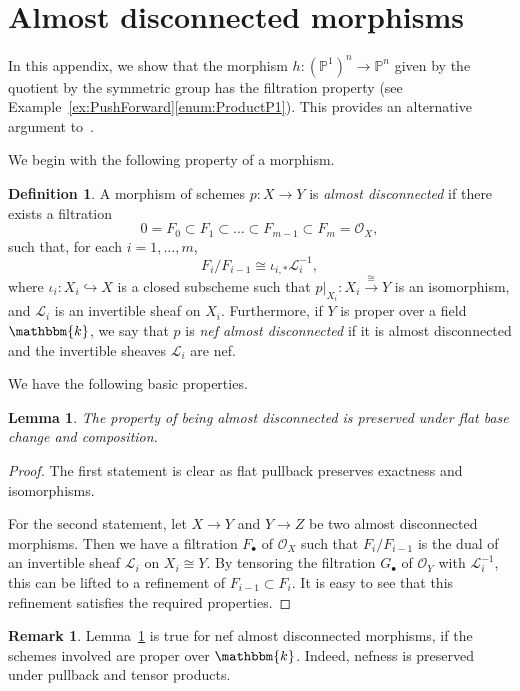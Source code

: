 \documentclass[11pt, reqno]{amsart}
\numberwithin{equation}{section}
\theoremstyle{plain}
\newtheorem{lemma}[theorem]{Lemma}
\theoremstyle{remark}
\theoremstyle{definition}
\newtheorem{definition}[theorem]{Definition}
\newtheorem{remark}[theorem]{Remark}
\theoremstyle{italicsname}
\newcommand{\cO}{\mathcal{O}}
\newcommand{\cL}{\mathcal{L}}
\newcommand{\KK}{\mathbbm{k}}
\def\PP{\ensuremath{\mathbb{P}}}
\begin{document}

\section{Almost disconnected morphisms}\label{app:Filtration}

In this appendix, we show that the morphism $h\colon(\PP^1)^n\to\PP^n$ given by the quotient by the symmetric group has the filtration property (see Example~\ref{ex:PushForward}\eqref{enum:ProductP1}). 
This provides an alternative argument to~\cite[Section 4]{chunyi-stability}.

We begin with the following property of a morphism.

\begin{definition}\label{def:AlmostDisconnected}
A morphism of schemes $p\colon X\to Y$ is \emph{almost disconnected} if there exists a filtration
\[
0=F_0 \subset F_1 \subset\dots\subset F_{m-1}\subset F_m=\cO_X,
\]
such that, for each $i=1,\dots,m$,
\[
F_i/F_{i-1}\cong \iota_{i,*}\cL_i^{-1},
\]
where $\iota_i\colon X_i\hookrightarrow X$ is a closed subscheme such that $p|_{X_i}\colon X_i\xrightarrow{\cong}Y$ is an isomorphism, and $\cL_i$ is an invertible sheaf on $X_i$.
Furthermore, if $Y$ is proper over a field $\KK$, we say that $p$ is \emph{nef almost disconnected} if it is almost disconnected and the invertible sheaves $\cL_i$ are nef.
\end{definition}

We have the following basic properties.

\begin{lemma}\label{lemma-filt-basic}
The property of being almost disconnected is preserved under flat base change and composition.
\end{lemma}

\begin{proof}
The first statement is clear as flat pullback preserves exactness and isomorphisms. 

For the second statement, let $X\to Y$ and $Y\to Z$ be two almost disconnected morphisms. 
Then we have a filtration $F_\bullet$ of $\cO_X$ such that $F_i/F_{i-1}$ is the dual of an invertible sheaf $\cL_i$ on $X_i\cong Y$.
By tensoring the filtration $G_\bullet$ of $\cO_Y$ with $\cL_i^{-1}$, this can be lifted to a refinement of $F_{i-1}\subset F_{i}$. 
It is easy to see that this refinement satisfies the required properties.
\end{proof}

\begin{remark}\label{rmk:FiltBasicNefDisconnected}
Lemma~\ref{lemma-filt-basic} is true for nef almost disconnected morphisms, if the schemes involved are proper over $\KK$.
Indeed, nefness is preserved under pullback and tensor products.
\end{remark}
\end{document}
